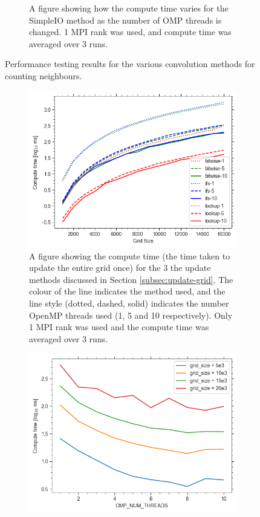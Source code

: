\begin{figure}[t]
\begin{subfigure}{0.9\textwidth}
  \caption{A figure showing how the compute time varies for the SimpleIO method as the number of OMP threads is changed.
    1 MPI rank was used, and compute time was averaged over 3 runs.}
  \label{fig:simpleio}
\end{subfigure}
\caption{Performance testing results for the various convolution methods for counting neighbours.}
\label{fig:conv}
\end{figure}

\begin{figure}[t]
\centering
\begin{subfigure}{0.9\textwidth}
  \centering
  \includegraphics[width=.8\linewidth]{./figures/transitions}
  \caption{A figure showing the compute time (the time taken to update the entire grid once) for the 3 the update methods
    discussed in Section \eqref{subsec:update-grid}.
    The colour of the line indicates the method used, and the line style (dotted, dashed, solid) indicates the number
    OpenMP threads used (1, 5 and 10 respectively).
    Only 1 MPI rank was used and the compute time was averaged over 3 runs.}
  \label{fig:transitions}
\end{subfigure}%
\hfill
\begin{subfigure}{0.9\textwidth}
  \centering
  \includegraphics[width=0.8\linewidth]{./figures/lookup}

\end{subfigure}
\end{figure}
